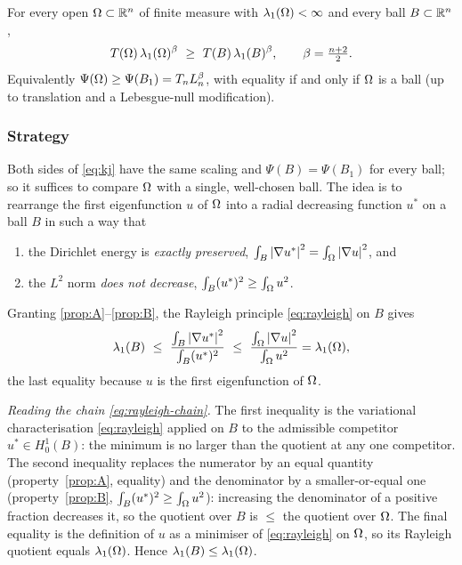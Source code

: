 \begin{theorem}\label{thm:kj}
For every open $\Omega\subset\mathbb R^n$ of finite measure with $\lambda_1(\Omega)<\infty$
and every ball $B\subset\mathbb R^n$,
\begin{equation}\label{eq:kj}
  T(\Omega)\,\lambda_1(\Omega)^{\beta}\ \ge\ T(B)\,\lambda_1(B)^{\beta},
  \qquad\beta=\tfrac{n+2}{2}.
\end{equation}
Equivalently $\Psi(\Omega)\ge\Psi(B_1)=T_n L_n^{\beta}$, with equality if and
only if $\Omega$ is a ball (up to translation and a Lebesgue-null modification).
\end{theorem}

\subsubsection*{Strategy}

Both sides of \eqref{eq:kj} have the same scaling and $\Psi(B)=\Psi(B_1)$
for every ball; so it suffices to compare $\Omega$ with a single, well-chosen
ball. The idea is to rearrange the first eigenfunction $u$ of $\Omega$ into a
radial decreasing function $u^*$ on a ball $B$ in such a way that
\begin{enumerate}[label=\textup{(\Alph*)}]
\item\label{prop:A} the Dirichlet energy is \emph{exactly preserved},
$\int_B\left|\nabla u^*\right|^2=\int_\Omega\left|\nabla u\right|^2$, and
\item\label{prop:B} the $L^2$ norm \emph{does not decrease},
$\int_B(u^*)^2\ge\int_\Omega u^2$.
\end{enumerate}
Granting \ref{prop:A}--\ref{prop:B}, the Rayleigh principle
\eqref{eq:rayleigh} on $B$ gives
\begin{equation}\label{eq:rayleigh-chain}
  \lambda_1(B)\ \le\
  \frac{\int_B\left|\nabla u^*\right|^2}{\int_B(u^*)^2}
  \ \le\
  \frac{\int_\Omega\left|\nabla u\right|^2}{\int_\Omega u^2}
  =\lambda_1(\Omega),
\end{equation}
the last equality because $u$ is the first eigenfunction of $\Omega$.

\emph{Reading the chain \eqref{eq:rayleigh-chain}.} The first inequality is
the variational characterisation \eqref{eq:rayleigh} applied on $B$ to the
admissible competitor $u^*\in H^1_0(B)$: the minimum is no larger than the
quotient at any one competitor. The second inequality replaces the
numerator by an equal quantity (property~\ref{prop:A}, equality) and the
denominator by a smaller-or-equal one (property~\ref{prop:B},
$\int_B(u^*)^2\ge\int_\Omega u^2$): increasing the denominator of a positive
fraction decreases it, so the quotient over $B$ is $\le$ the quotient over
$\Omega$. The final equality is the definition of $u$ as a minimiser of
\eqref{eq:rayleigh} on $\Omega$, so its Rayleigh quotient equals
$\lambda_1(\Omega)$. Hence $\lambda_1(B)\le\lambda_1(\Omega)$.

